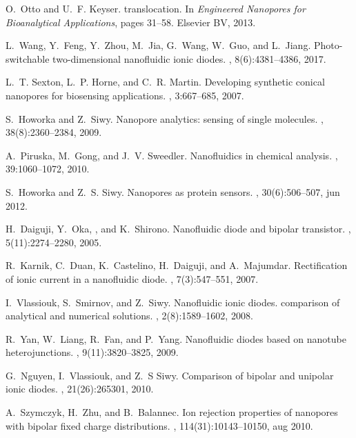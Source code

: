 \documentclass[fleqn,10pt]{SelfArx} %
\begin{document}
\begin{thebibliography}{10}
O.~Otto and U.~F. Keyser.
 translocation.
\newblock In {\em Engineered Nanopores for Bioanalytical Applications}, pages
  31--58. Elsevier {BV}, 2013.

L.~Wang, Y.~Feng, Y.~Zhou, M.~Jia, G.~Wang, W.~Guo, and L.~Jiang.
\newblock Photo-switchable two-dimensional nanofluidic ionic diodes.
, 8(6):4381--4386, 2017.

L.~T. Sexton, L.~P. Horne, and C.~R. Martin.
\newblock Developing synthetic conical nanopores for biosensing applications.
, 3:667--685, 2007.

S.~Howorka and Z.~Siwy.
\newblock Nanopore analytics: sensing of single molecules.
, 38(8):2360--2384, 2009.

A.~Piruska, M.~Gong, and J.~V. Sweedler.
\newblock Nanofluidics in chemical analysis.
, 39:1060--1072, 2010.

S.~Howorka and Z.~S. Siwy.
\newblock Nanopores as protein sensors.
, 30(6):506--507, jun 2012.

H.~Daiguji, Y.~Oka, , and K.~Shirono.
\newblock Nanofluidic diode and bipolar transistor.
, 5(11):2274--2280, 2005.

R.~Karnik, C.~Duan, K.~Castelino, H.~Daiguji, and A.~Majumdar.
\newblock Rectification of ionic current in a nanofluidic diode.
, 7(3):547--551, 2007.

I.~Vlassiouk, S.~Smirnov, and Z.~Siwy.
\newblock Nanofluidic ionic diodes. comparison of analytical and numerical
  solutions.
, 2(8):1589--1602, 2008.

R.~Yan, W.~Liang, R.~Fan, and P.~Yang.
\newblock Nanofluidic diodes based on nanotube heterojunctions.
, 9(11):3820--3825, 2009.

G.~Nguyen, I.~Vlassiouk, and Z.~S Siwy.
\newblock Comparison of bipolar and unipolar ionic diodes.
, 21(26):265301, 2010.

A.~Szymczyk, H.~Zhu, and B.~Balannec.
\newblock Ion rejection properties of nanopores with bipolar fixed charge
  distributions.
, 114(31):10143--10150, aug 2010.


\end{thebibliography}
\end{document}
